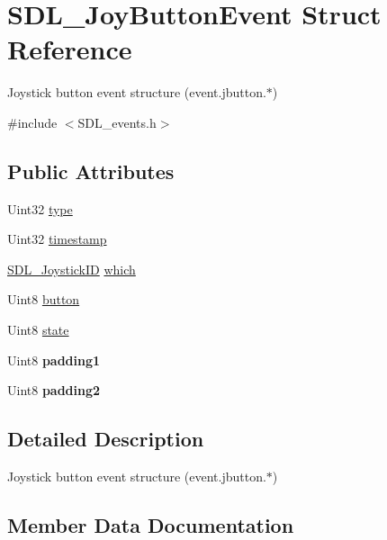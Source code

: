 \hypertarget{struct_s_d_l___joy_button_event}{}\section{S\+D\+L\+\_\+\+Joy\+Button\+Event Struct Reference}
\label{struct_s_d_l___joy_button_event}


Joystick button event structure (event.\+jbutton.$\ast$)  




{\ttfamily \#include $<$S\+D\+L\+\_\+events.\+h$>$}

\subsection*{Public Attributes}
\begin{DoxyCompactItemize}
\item 
Uint32 \mbox{\hyperlink{struct_s_d_l___joy_button_event_a8f3312a046d37fa2884b93f69c4cb655}{type}}
\item 
Uint32 \mbox{\hyperlink{struct_s_d_l___joy_button_event_ab50b6f7d1ab3ac53df69fc2d6cf5fa2a}{timestamp}}
\item 
\mbox{\hyperlink{_s_d_l__joystick_8h_a3c3d32500cb08f76ee8077983912c0bd}{S\+D\+L\+\_\+\+Joystick\+ID}} \mbox{\hyperlink{struct_s_d_l___joy_button_event_a1679049adad7242b28420948fdc79044}{which}}
\item 
Uint8 \mbox{\hyperlink{struct_s_d_l___joy_button_event_a73ebe4261cf80564052af9c1af737a4d}{button}}
\item 
Uint8 \mbox{\hyperlink{struct_s_d_l___joy_button_event_ad3b6f8d9aa2c5e694f664b97d12bcd2b}{state}}
\item 
\mbox{\label{struct_s_d_l___joy_button_event_a3e7ca473fb7783d755d64598529b1ff9}} 
Uint8 {\bfseries padding1}
\item 
\mbox{\label{struct_s_d_l___joy_button_event_a77a78bee38f4bf0682ccd97bbf8f9ab9}} 
Uint8 {\bfseries padding2}
\end{DoxyCompactItemize}


\subsection{Detailed Description}
Joystick button event structure (event.\+jbutton.$\ast$) 

\subsection{Member Data Documentation}
\mbox{\label{struct_s_d_l___joy_button_event_a73ebe4261cf80564052af9c1af737a4d}} 
